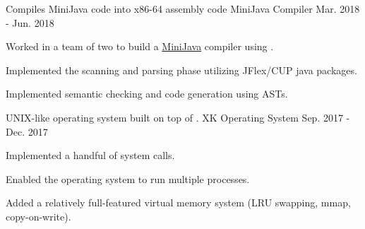 \begin{cventries}
  \cventry
    {Compiles MiniJava code into x86-64 assembly code} %
    {MiniJava Compiler} %
    {} %
    {Mar. 2018 - Jun. 2018} %
    {
      \begin{cvitems} %
        \item {Worked in a team of two to build a \href{http://www.cambridge.org/resources/052182060X/} {\color{awesome-skyblue}MiniJava} compiler using . }
        \item {Implemented the scanning and parsing phase utilizing JFlex/CUP java packages.}
        \item {Implemented semantic checking and code generation using ASTs.}
      \end{cvitems}
    }

  \cventry
    {UNIX-like operating system built on top of \href{https://pdos.csail.mit.edu/6.828/2012/xv6.html}{\color{awesome-skyblue}{xv6}}.} %
    {XK Operating System} %
    {} %
    {Sep. 2017 - Dec. 2017} %
    {
      \begin{cvitems} %
        \item{Implemented a handful of system calls.}
        \item{Enabled the operating system to run multiple processes.}
        \item{Added a relatively full-featured virtual memory system (LRU swapping, mmap, copy-on-write).}
      \end{cvitems}
    }
\end{cventries}